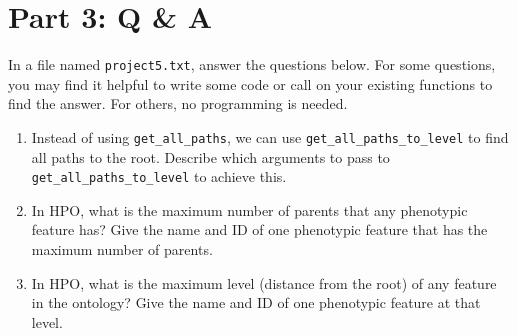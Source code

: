 \documentclass[a4paper]{article}
\begin{document}
\newpage 
\section{Part 3: Q \& A}

In a file named \texttt{project5.txt}, answer the  questions below.  For some questions, you may find it helpful to write some code or call on your existing functions to find the answer.  For others, no programming is needed.

\begin{enumerate}
\item Instead of using \verb|get_all_paths|, we can use
\verb|get_all_paths_to_level| to find all paths to the root. Describe which arguments to pass to \verb|get_all_paths_to_level| to achieve this.
\item In HPO, what is the maximum number of parents that any phenotypic feature has?  Give the name and ID of one phenotypic feature that has the maximum number of parents.
\item In HPO, what is the maximum level (distance from the root) of any feature in the ontology?  Give the name and ID of one phenotypic feature at that level.
\end{enumerate}

{}

\end{document}
